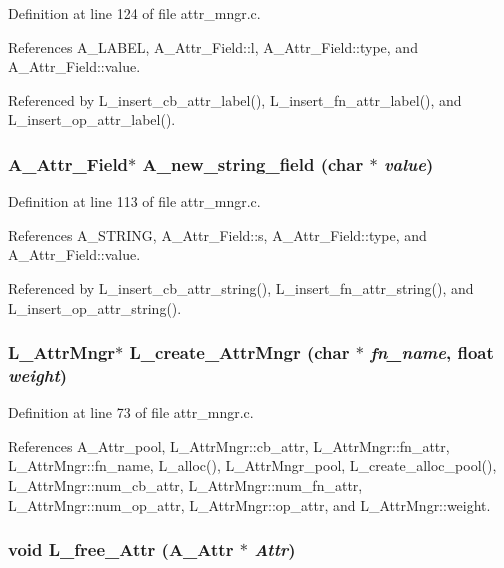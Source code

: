 Definition at line 124 of file attr\_\-mngr.c.

References A\_\-LABEL, A\_\-Attr\_\-Field::l, A\_\-Attr\_\-Field::type, and A\_\-Attr\_\-Field::value.

Referenced by L\_\-insert\_\-cb\_\-attr\_\-label(), L\_\-insert\_\-fn\_\-attr\_\-label(), and L\_\-insert\_\-op\_\-attr\_\-label().
\subsubsection{\setlength{\rightskip}{0pt plus 5cm}\bf{A\_\-Attr\_\-Field}$\ast$ A\_\-new\_\-string\_\-field (char $\ast$ {\em value})}\label{attr__mngr_8c_59e62483636f2067ea64b5fca3c7f5cc}




Definition at line 113 of file attr\_\-mngr.c.

References A\_\-STRING, A\_\-Attr\_\-Field::s, A\_\-Attr\_\-Field::type, and A\_\-Attr\_\-Field::value.

Referenced by L\_\-insert\_\-cb\_\-attr\_\-string(), L\_\-insert\_\-fn\_\-attr\_\-string(), and L\_\-insert\_\-op\_\-attr\_\-string().
\subsubsection{\setlength{\rightskip}{0pt plus 5cm}\bf{L\_\-Attr\-Mngr}$\ast$ L\_\-create\_\-Attr\-Mngr (char $\ast$ {\em fn\_\-name}, float {\em weight})}\label{attr__mngr_8c_88588be8b42498d527b5a3ac9d0f1645}




Definition at line 73 of file attr\_\-mngr.c.

References A\_\-Attr\_\-pool, L\_\-Attr\-Mngr::cb\_\-attr, L\_\-Attr\-Mngr::fn\_\-attr, L\_\-Attr\-Mngr::fn\_\-name, L\_\-alloc(), L\_\-Attr\-Mngr\_\-pool, L\_\-create\_\-alloc\_\-pool(), L\_\-Attr\-Mngr::num\_\-cb\_\-attr, L\_\-Attr\-Mngr::num\_\-fn\_\-attr, L\_\-Attr\-Mngr::num\_\-op\_\-attr, L\_\-Attr\-Mngr::op\_\-attr, and L\_\-Attr\-Mngr::weight.
\subsubsection{\setlength{\rightskip}{0pt plus 5cm}void L\_\-free\_\-Attr (\bf{A\_\-Attr} $\ast$ {\em Attr})}\label{attr__mngr_8c_56c92a355df9769616a247a121bd5924}




